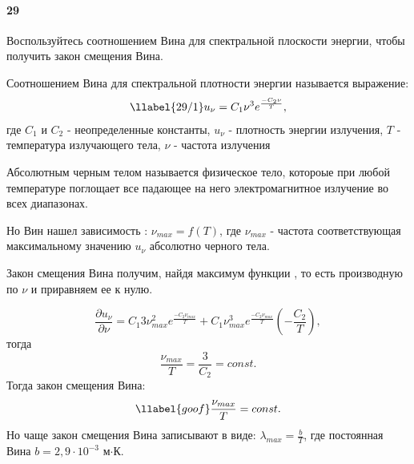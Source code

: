


\paragraph{29}
Воспользуйтесь соотношением Вина для спектральной плоскости энергии, чтобы получить закон смещения Вина.
\begin{definition}
	Соотношением Вина для спектральной плотности энергии называется выражение: 
	\begin{gather}
	\llabel{29/1}
          u_{\nu}=C_{1}\nu^{3}e^{\frac{-C_{2}\nu}{T}},
	\end{gather}
где $C_{1}$ и $C_{2}$ - неопределенные константы, $u_{\nu}$ - плотность энергии излучения, $T$ - температура излучающего тела, $\nu$ - частота излучения
\end{definition}

\begin{definition}
	Абсолютным черным телом называется физическое тело, котороые при любой температуре поглощает все падающее на него электромагнитное излучение во всех диапазонах.
\end{definition}
Но Вин нашел зависимость : $\nu_{max} = f(T)$, где $\nu_{max}$ - частота соответствующая максимальному значению $u_{\nu}$ абсолютно черного тела.

Закон смещения Вина получим, найдя максимум функции , то есть производную по $\nu$ и приравняем ее к нулю.

$$
   \frac {\partial u_{\nu}}{\partial \nu}= C_{1}3\nu_{max}^{2}e^{\frac{-C_{2}\nu_{max}}{T}}+
   C_{1}\nu_{max}^{3}e^{\frac{-C_{2}\nu_{max}}{T}}(-\frac{C_{2}}{T}),
$$
тогда
$$
    \frac{\nu_{max}}{T}=\frac{3}{C_{2}}=const.
$$
Тогда закон смещения Вина:
\begin{gather}
\llabel{goof}
            \frac{\nu_{max}}{T}=const.
\end{gather}
Но чаще закон смещения Вина записывают в виде: $\lambda_{max}=\frac{b}{T}$, где постоянная Вина $b=2,9\cdot10^{-3}$ м$\cdot$К. 
